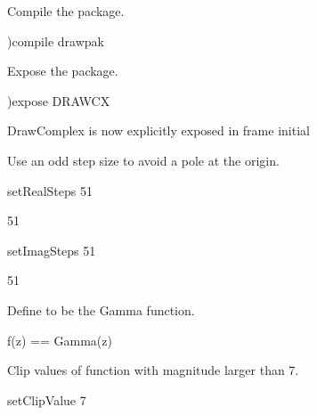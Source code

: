 \begin{nullXtc}
\begin{xtccomment}
Compile the package.
\end{xtccomment}
\begin{spadsrc}
)compile drawpak
\end{spadsrc}
\end{nullXtc}
\begin{xtc}
\begin{xtccomment}
Expose the package.
\end{xtccomment}
\begin{spadsrc}
)expose DRAWCX 
\end{spadsrc}
\begin{SysCmdOutput}
   DrawComplex is now explicitly exposed in frame initial 
\end{SysCmdOutput}
\end{xtc}
\begin{xtc}
\begin{xtccomment}
Use an odd step size to avoid
a pole at the origin.
\end{xtccomment}
\begin{spadsrc}
setRealSteps 51 
\end{spadsrc}
\begin{TeXOutput}
\begin{fricasmath}{1}
51%
\end{fricasmath}
\end{TeXOutput}
\end{xtc}
\begin{xtc}
\begin{xtccomment}
\end{xtccomment}
\begin{spadsrc}
setImagSteps 51 
\end{spadsrc}
\begin{TeXOutput}
\begin{fricasmath}{2}
51%
\end{fricasmath}
\end{TeXOutput}
\end{xtc}
\begin{xtc}
\begin{xtccomment}
Define  to be the Gamma function.
\end{xtccomment}
\begin{spadsrc}
f(z) == Gamma(z) 
\end{spadsrc}
\end{xtc}
\begin{xtc}
\begin{xtccomment}
Clip values of function with magnitude larger than 7.
\end{xtccomment}
\begin{spadsrc}
setClipValue 7
\end{spadsrc}
\begin{TeXOutput}
\begin{fricasmath}{4}
%
\end{fricasmath}
\end{TeXOutput}
\end{xtc}
